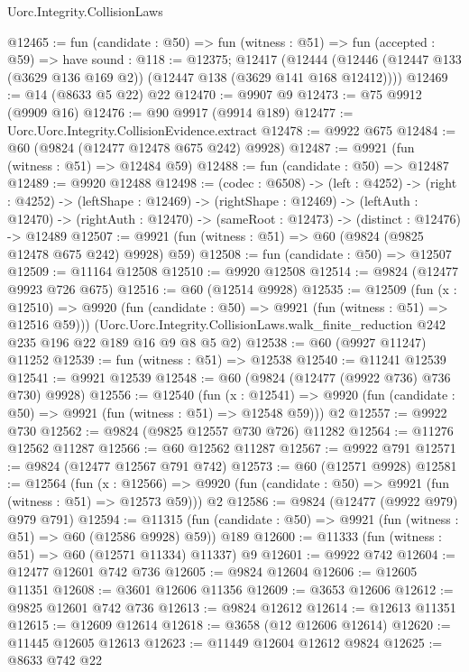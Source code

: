 \begin{lexlean}{Uorc.Integrity.CollisionLaws}
\begin{coremodule}
@12465 := fun (candidate : @50) =>
  fun (witness : @51) =>
  fun (accepted : @59) =>
  have sound : @118 := @12375;
  @12417 (@12444 (@12446 (@12447 @133 (@3629 @136 @169 @2)) (@12447 @138 (@3629 @141 @168 @12412))))
@12469 := @14 (@8633 @5 @22) @22
@12470 := @9907 @9
@12473 := @75 @9912 (@9909 @16)
@12476 := @90 @9917 (@9914 @189)
@12477 := Uorc.Uorc.Integrity.CollisionEvidence.extract
@12478 := @9922 @675
@12484 := @60 (@9824 (@12477 @12478 @675 @242) @9928)
@12487 := @9921 (fun (witness : @51) => @12484 @59)
@12488 := fun (candidate : @50) => @12487
@12489 := @9920 @12488
@12498 := (codec : @6508) ->
  (left : @4252) ->
  (right : @4252) ->
  (leftShape : @12469) ->
  (rightShape : @12469) ->
  (leftAuth : @12470) ->
  (rightAuth : @12470) -> (sameRoot : @12473) -> (distinct : @12476) -> @12489
@12507 := @9921 (fun (witness : @51) => @60 (@9824 (@9825 @12478 @675 @242) @9928) @59)
@12508 := fun (candidate : @50) => @12507
@12509 := @11164 @12508
@12510 := @9920 @12508
@12514 := @9824 (@12477 @9923 @726 @675)
@12516 := @60 (@12514 @9928)
@12535 := @12509
    (fun (x : @12510) => @9920 (fun (candidate : @50) => @9921 (fun (witness : @51) => @12516 @59)))
    (Uorc.Uorc.Integrity.CollisionLaws.walk_finite_reduction
      @242
      @235
      @196
      @22
      @189
      @16
      @9
      @8
      @5
      @2)
@12538 := @60 (@9927 @11247) @11252
@12539 := fun (witness : @51) => @12538
@12540 := @11241 @12539
@12541 := @9921 @12539
@12548 := @60 (@9824 (@12477 (@9922 @736) @736 @730) @9928)
@12556 := @12540
    (fun (x : @12541) => @9920 (fun (candidate : @50) => @9921 (fun (witness : @51) => @12548 @59)))
    @2
@12557 := @9922 @730
@12562 := @9824 (@9825 @12557 @730 @726) @11282
@12564 := @11276 @12562 @11287
@12566 := @60 @12562 @11287
@12567 := @9922 @791
@12571 := @9824 (@12477 @12567 @791 @742)
@12573 := @60 (@12571 @9928)
@12581 := @12564
    (fun (x : @12566) => @9920 (fun (candidate : @50) => @9921 (fun (witness : @51) => @12573 @59)))
    @2
@12586 := @9824 (@12477 (@9922 @979) @979 @791)
@12594 := @11315
    (fun (candidate : @50) => @9921 (fun (witness : @51) => @60 (@12586 @9928) @59))
    @189
@12600 := @11333 (fun (witness : @51) => @60 (@12571 @11334) @11337) @9
@12601 := @9922 @742
@12604 := @12477 @12601 @742 @736
@12605 := @9824 @12604
@12606 := @12605 @11351
@12608 := @3601 @12606 @11356
@12609 := @3653 @12606
@12612 := @9825 @12601 @742 @736
@12613 := @9824 @12612
@12614 := @12613 @11351
@12615 := @12609 @12614
@12618 := @3658 (@12 @12606 @12614)
@12620 := @11445 @12605 @12613
@12623 := @11449 @12604 @12612 @9824
@12625 := @8633 @742 @22

\end{coremodule}
\end{lexlean}
